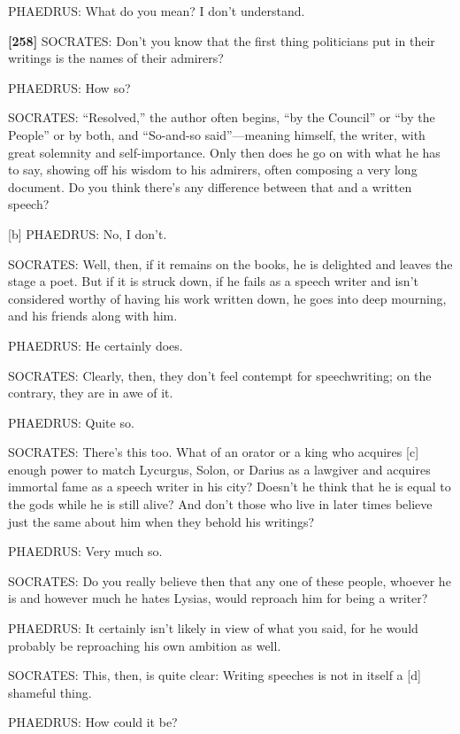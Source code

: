 PHAEDRUS: What do you mean? I don't understand.

{\bf {[}258{]}} SOCRATES: Don't you know that the first thing
politicians put in their
writings is the names
of their admirers?

PHAEDRUS: How so?

SOCRATES: “Resolved,” the author often begins, “by the Council” or “by
the People” or by both, and “So-and-so
said”---meaning
himself, the writer, with great solemnity and self-importance. Only then
does he go on with what he has to say, showing off his wisdom to his
admirers, often composing a very long document. Do you think there's any
difference between that and a written speech?

{[}b{]} PHAEDRUS: No, I don't.

SOCRATES: Well, then, if it remains on the books, he is delighted and
leaves the stage a poet. But if it is struck down, if he fails as a
speech writer and isn't considered worthy of having his work written
down, he goes into deep mourning, and his friends along with him.

PHAEDRUS: He certainly does.

SOCRATES: Clearly, then, they don't feel contempt for speechwriting; on
the contrary, they are in awe of it.

PHAEDRUS: Quite so.

SOCRATES: There's this too. What of an orator or a king who acquires
{[}c{]} enough power to match Lycurgus, Solon, or Darius as a
lawgiver and acquires
immortal fame as a speech writer in his city? Doesn't he think that he
is equal to the gods while he is still alive? And don't those who live
in later times believe just the same about him when they behold his
writings?

PHAEDRUS: Very much so.

SOCRATES: Do you really believe then that any one of these people,
whoever he is and however much he hates Lysias, would reproach him for
being a writer?

PHAEDRUS: It certainly isn't likely in view of what you said, for he
would probably be reproaching his own ambition as well.

SOCRATES: This, then, is quite clear: Writing speeches is not in itself
a {[}d{]} shameful thing.

PHAEDRUS: How could it be?


